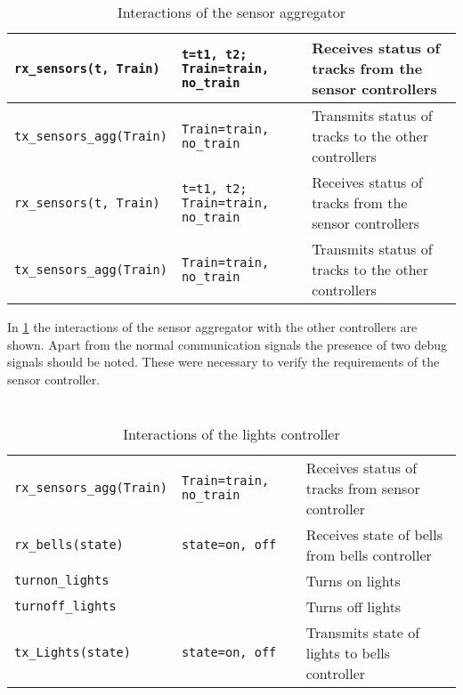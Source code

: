 \documentclass[final]{report}
\begin{document}
\section{}
\begin{table}[H]
\centering
    \begin{tabular}{|l|l|l|}
    \hline
    \texttt{rx\_sensors(t, Train)}   & \texttt{t=t1, t2; Train=train, no\_train} & Receives status of tracks from the sensor controllers \\ \hline
    \texttt{tx\_sensors\_agg(Train)} & \texttt{Train=train, no\_train}           & Transmits status of tracks to the other controllers   \\
    \texttt{rx\_sensors(t, Train)}   & \texttt{t=t1, t2; Train=train, no\_train} & Receives status of tracks from the sensor controllers \\ \hline
    \texttt{tx\_sensors\_agg(Train)} & \texttt{Train=train, no\_train}           & Transmits status of tracks to the other controllers   \\ \hline
    \end{tabular}
\caption{Interactions of the sensor aggregator}
\label{tab:sensorAggSignals}
\end{table}

In \cref{tab:sensorAggSignals} the interactions of the sensor aggregator with the other controllers are shown.
Apart from the normal communication signals the presence of two debug signals should be noted.
These were necessary to verify the requirements of the sensor controller.

\section{}
\begin{table}[H]
\centering
    \begin{tabular}{|l|l|l|}
    \hline
    \texttt{rx\_sensors\_agg(Train)} & \texttt{Train=train, no\_train} & Receives status of tracks from sensor controller \\
    \texttt{rx\_bells(state)}        & \texttt{state=on, off}          & Receives state of bells from bells controller    \\ \hline
    \texttt{turnon\_lights}          &                                 & Turns on lights                                  \\
    \texttt{turnoff\_lights}         &                                 & Turns off lights                                 \\
    \texttt{tx\_Lights(state)}       & \texttt{state=on, off}          & Transmits state of lights to bells controller    \\ \hline
    \end{tabular}
\caption{Interactions of the lights controller}
\label{tab:lightsSignals}
\end{table}
\end{document}
